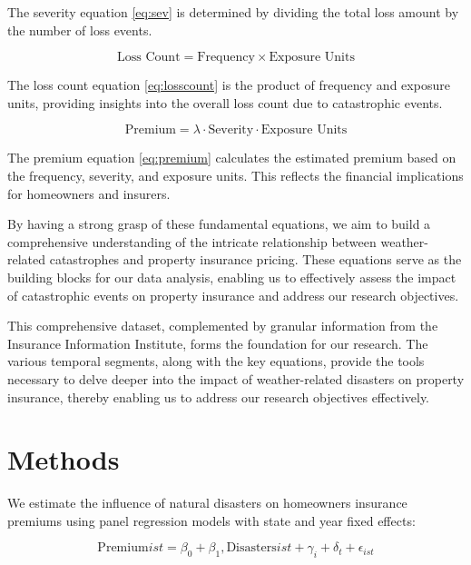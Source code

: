 \documentclass[12pt]{article}
\begin{document}
The severity equation \ref{eq:sev} is determined by dividing the total loss amount by the number of loss events.

\begin{equation}
    \label{eq:losscount}
    \text{Loss Count} = \text{Frequency} \times \text{Exposure Units}
\end{equation}

The loss count equation \ref{eq:losscount} is the product of frequency and exposure units, providing insights into the overall loss count due to catastrophic events.

\begin{equation}
    \label{eq:premium}
    \text{Premium} = \lambda \cdot \text{Severity} \cdot \text{Exposure Units}
\end{equation}

The premium equation \ref{eq:premium} calculates the estimated premium based on the frequency, severity, and exposure units. This 
reflects the financial implications for homeowners and insurers.

By having a strong grasp of these fundamental equations, we aim to build a comprehensive understanding of the intricate relationship 
between weather-related catastrophes and property insurance pricing. These equations serve as the building blocks for our data 
analysis, enabling us to effectively assess the impact of catastrophic events on property insurance and address our research 
objectives.

This comprehensive dataset, complemented by granular information from the Insurance Information Institute, forms the foundation for 
our research. The various temporal segments, along with the key equations, provide the tools necessary to delve deeper into the 
impact of weather-related disasters on property insurance, thereby enabling us to address our research objectives effectively. 



\section{Methods}
\label{sec:meth}
We estimate the influence of natural disasters on homeowners insurance premiums using panel regression models with state and year 
fixed effects:

\begin{equation} 
    \mathrm{Premium}{ist} = \beta_0 + \beta_1 , \mathrm{Disasters}{ist} + \gamma_i + \delta_t + \epsilon_{ist} 
\end{equation}
\end{document}
